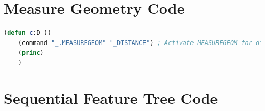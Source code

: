 \documentclass{report}
\begin{document}
\chapter{Measure Geometry Code}


\begin{lstlisting}[language=Lisp]
	(defun c:D ()
	(command "_.MEASUREGEOM" "_DISTANCE") ; Activate MEASUREGEOM for distance
	(princ)
	)
\end{lstlisting}

\chapter{Sequential Feature Tree Code}
\end{document}
